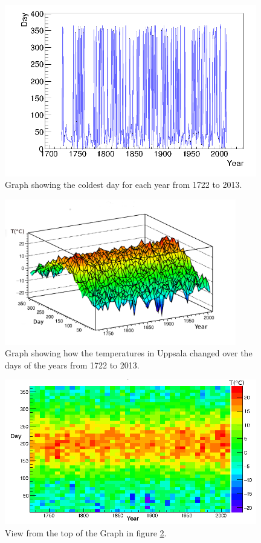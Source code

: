 \documentclass[a4paper]{article}
\begin{document}
\begin{figure}[H]
\begin{center}
\includegraphics[width=11cm]{graph1D.png}
\caption{Graph showing the coldest day for each year from 1722 to 2013.}
\label{fig:ColdGraph}
\end{center}
\end{figure}

\begin{figure}[H]
\begin{center}
\includegraphics[width=0.9\textwidth]{2Dgraph1.png}
\caption{Graph showing how the temperatures in Uppsala changed over the days of the years from 1722 to 2013.}
\label{fig:3D}
\end{center}
\end{figure}

\begin{figure}[H]
\begin{center}
\includegraphics[width=11cm]{2Dgraphint.png}
\caption{View from the top of the Graph in figure \ref{fig:3D}.}
\label{fig:top3D}
\end{center}
\end{figure}
\end{document}
